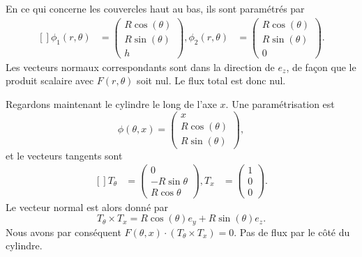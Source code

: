 \begin{example}
    En ce qui concerne les couvercles haut au bas, ils sont paramétrés par
    \begin{equation}
        \begin{aligned}[]
            \phi_1(r,\theta)&=\begin{pmatrix}
                R\cos(\theta)    \\
                R\sin(\theta)    \\
                h
            \end{pmatrix},
            \phi_2(r,\theta)&=\begin{pmatrix}
                R\cos(\theta)    \\
                R\sin(\theta)    \\
                0
            \end{pmatrix}.
        \end{aligned}
    \end{equation}
    Les vecteurs normaux correspondants sont dans la direction de $e_z$, de façon que le produit scalaire avec $F(r,\theta)$ soit nul. Le flux total est donc nul.

    Regardons maintenant le cylindre le long de l'axe $x$. Une paramétrisation est
    \begin{equation}
        \phi(\theta,x)=\begin{pmatrix}
            x    \\
            R\cos(\theta)    \\
            R\sin(\theta)
        \end{pmatrix},
    \end{equation}
    et le vecteurs tangents sont
    \begin{equation}
        \begin{aligned}[]
            T_{\theta}&=\begin{pmatrix}
                0    \\
                -R\sin\theta    \\
                R\cos\theta
            \end{pmatrix},
            T_x&=\begin{pmatrix}
                1    \\
                0    \\
                0
            \end{pmatrix}.
        \end{aligned}
    \end{equation}
    Le vecteur normal est alors donné par
    \begin{equation}
        T_{\theta}\times T_x=R\cos(\theta)e_y+R\sin(\theta)e_z.
    \end{equation}
    Nous avons par conséquent $F(\theta,x)\cdot (T_{\theta}\times T_x)=0$. Pas de flux par le côté du cylindre.


\end{example}
